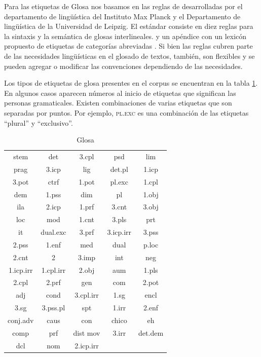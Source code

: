 \documentclass[letterpaper,12pt,oneside]{book}
\theoremstyle{definition}
\begin{document}
Para las etiquetas de Glosa nos basamos en las reglas de \citet{comrie2008leipzig} desarrolladas por el departamento de lingüística del Instituto Max Planck y el Departamento de lingüística de la Universidad de Leipzig. El estándar consiste en diez reglas para la sintaxis y la semántica de glosas interlineales. y un apéndice con un lexicón propuesto de etiquetas de categorías abreviadas \citep{comrie2008leipzig}. Si bien las reglas cubren parte de las necesidades lingüísticas en el glosado de textos, también, son flexibles y se pueden agregar o modificar las convenciones dependiendo de las necesidades.

Los tipos de etiquetas de glosa presentes en el corpus se encuentran en la tabla \ref{table:gloss_types}. En algunos casos aparecen números al inicio de etiquetas que significan las personas gramaticales. Existen combinaciones de varias etiquetas que son separadas por puntos. Por ejemplo, \textsc{pl.exc} es una combinación de las etiquetas ``plural'' y ``exclusivo''.

\begin{table}
	\centering
	\begin{tabular}{| c | c | c | c | c |}\hline
		 stem & det & 3.cpl & psd & lim \\
         prag & 3.icp & lig & det.pl & 1.icp \\
         3.pot & ctrf & 1.pot & pl.exc & 1.cpl \\
         dem & 1.pss & dim & pl & 1.obj \\
         ila & 2.icp & 1.prf & 3.cnt & 3.obj \\
         loc & mod & 1.cnt & 3.pls & prt \\
         it & dual.exc & 3.prf & 3.icp.irr & 3.pss \\
         2.pss & 1.enf & med & dual & p.loc \\
         2.cnt & 2 & 3.imp & int & neg \\
         1.icp.irr & 1.cpl.irr & 2.obj & aum & 1.pls \\
         2.cpl & 2.prf & gen & com & 2.pot\\
         adj & cond  & 3.cpl.irr & 1.sg & encl \\
         3.sg & 3.pss.pl & spt & 1.irr & 2.enf \\
         conj.adv & caus & con & chico & eh \\
         comp & prf & dist mov & 3.irr & det.dem\\
         dcl & nom & 2.icp.irr & & \\
		\hline
	\end{tabular}
	\caption{Glosa}
	\label{table:gloss_types}
\end{table}
\end{document}
